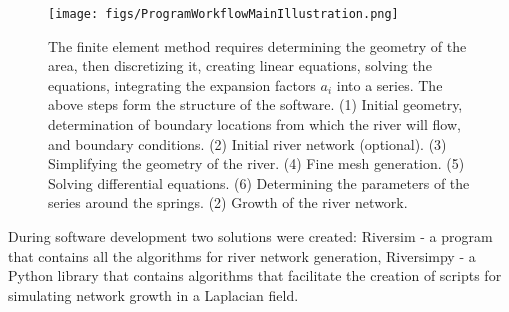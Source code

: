 \documentclass[]{pracamgr}
\begin{document}
    \begin{figure}[H]
      \centering
      \texttt{[image: figs/ProgramWorkflowMainIllustration.png]}
      \caption{The finite element method requires determining the geometry of the area, then discretizing it, creating linear equations, solving the equations, integrating the expansion factors $a_i$ into a series. The above steps form the structure of the software. (1) Initial geometry, determination of boundary locations from which the river will flow, and boundary conditions. (2) Initial river network (optional). (3) Simplifying the geometry of the river. (4) Fine mesh generation. (5) Solving differential equations. (6) Determining the parameters of the series around the springs. (2) Growth of the river network.}
      \label{program_workflow}
    \end{figure}
      
    During software development two solutions were created: Riversim\cite{Riversim} - a program that contains all the algorithms for river network generation, Riversimpy\cite{Riversimpy} - a Python library that contains algorithms that facilitate the creation of scripts for simulating network growth in a Laplacian field.
    
\end{document}
